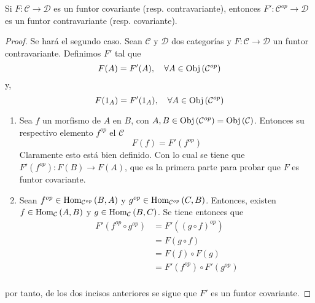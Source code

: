 \documentclass[12pt]{report}
\theoremstyle{largebreak}
\newcommand\cf[3]{\ensuremath{#1:#2\rightarrow#3}}
\newcommand{\Obj}[1]{\ensuremath{\textup{Obj}\left(#1\right)}}
\newcommand{\Hom}[3]{\ensuremath{\textup{Hom}_{#1}\left(#2,#3\right)}}
\begin{document}
    \begin{propo}
        Si $\cf{F}{\mathcal{C}}{\mathcal{D}}$ es un funtor covariante (resp. contravariante), entonces $\cf{F'}{\mathcal{C}^{op}}{\mathcal{D}}$ es un funtor contravariante (resp. covariante).
    \end{propo}

    \begin{proof}
        Se hará el segundo caso. Sean $\mathcal{C}$ y $\mathcal{D}$ dos categorías y $\cf{F}{\mathcal{C}}{\mathcal{D}}$ un funtor contravariante. Definimos $F'$ tal que
        \begin{equation*}
            F(A)=F'(A),\quad\forall A\in\Obj{\mathcal{C}^{op}}
        \end{equation*}
        y,
        \begin{equation*}
            F(1_A)=F'(1_A),\quad\forall A\in\Obj{\mathcal{C}^{op}}
        \end{equation*}
        \begin{enumerate}
            \item Sea $f$ un morfismo de $A$ en $B$, con $A,B\in\Obj{\mathcal{C}^{op}}=\Obj{\mathcal{C}}$. Entonces su respectivo elemento $f^{op}$ el $\mathcal{C}$
            \begin{equation*}
                F(f)=F'(f^{op})
            \end{equation*}
            Claramente esto está bien definido. Con lo cual se tiene que $\cf{F'(f^{op})}{F(B)}{F(A)}$, que es la primera parte para probar que $F$ es funtor covariante.
            \item Sean $f^{op}\in\Hom{\mathcal{C}^{op}}{B}{A}$ y $g^{op}\in\Hom{\mathcal{C}^{op}}{C}{B}$. Entonces, existen $f\in\Hom{\mathcal{C}}{A}{B}$ y $g\in\Hom{\mathcal{C}}{B}{C}$. Se tiene entonces que
            \begin{equation*}
                \begin{split}
                    F'(f^{op}\circ g^{op})&=F'((g\circ f)^{op})\\
                    &=F(g\circ f)\\
                    &=F(f)\circ F(g)\\
                    &=F'(f^{op})\circ F'(g^{op})\\
                \end{split}
            \end{equation*}
        \end{enumerate}
        por tanto, de los dos incisos anteriores se sigue que $F'$ es un funtor covariante.
    \end{proof}
\end{document}
